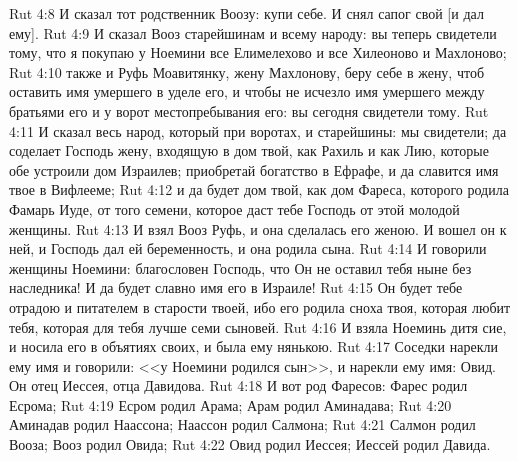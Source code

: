 \vs Rut 4:8 И сказал тот родственник Воозу: купи себе. И снял сапог свой [и дал ему].
\vs Rut 4:9 И сказал Вооз старейшинам и всему народу: вы теперь свидетели тому, что я покупаю у Ноемини все Елимелехово и все Хилеоново и Махлоново;
\vs Rut 4:10 также и Руфь Моавитянку, жену Махлонову, беру себе в жену, чтоб оставить имя умершего в уделе его, и чтобы не исчезло имя умершего между братьями его и у ворот местопребывания его: вы сегодня свидетели тому.
\vs Rut 4:11 И сказал весь народ, который при воротах, и старейшины: мы свидетели; да соделает Господь жену, входящую в дом твой, как Рахиль и как Лию, которые обе устроили дом Израилев; приобретай богатство в Ефрафе, и да славится имя твое в Вифлееме;
\vs Rut 4:12 и да будет дом твой, как дом Фареса, которого родила Фамарь Иуде, от того семени, которое даст тебе Господь от этой молодой женщины.
\vs Rut 4:13 И взял Вооз Руфь, и она сделалась его женою. И вошел он к ней, и Господь дал ей беременность, и она родила сына.
\vs Rut 4:14 И говорили женщины Ноемини: благословен Господь, что Он не оставил тебя ныне без наследника! И да будет славно имя его в Израиле!
\vs Rut 4:15 Он будет тебе отрадою и питателем в старости твоей, ибо его родила сноха твоя, которая любит тебя, которая для тебя лучше семи сыновей.
\vs Rut 4:16 И взяла Ноеминь дитя сие, и носила его в объятиях своих, и была ему нянькою.
\vs Rut 4:17 Соседки нарекли ему имя и говорили: <<у Ноемини родился сын>>, и нарекли ему имя: Овид. Он отец Иессея, отца Давидова.
\rsbpar\vs Rut 4:18 И вот род Фаресов: Фарес родил Есрома;
\vs Rut 4:19 Есром родил Арама; Арам родил Аминадава;
\vs Rut 4:20 Аминадав родил Наассона; Наассон родил Салмона;
\vs Rut 4:21 Салмон родил Вооза; Вооз родил Овида;
\vs Rut 4:22 Овид родил Иессея; Иессей родил Давида.
